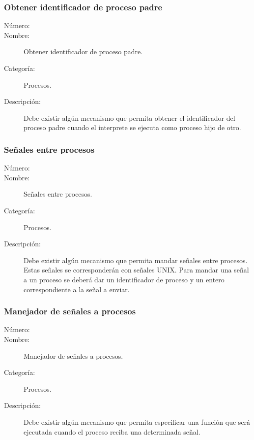\subsubsection{Obtener identificador de proceso padre}
	\begin{description}
		\item [Número:] \cn
		\item [Nombre:] Obtener identificador de proceso padre.
		\item [Categoría:] Procesos.
		\item [Descripción:] Debe existir algún mecanismo que permita obtener el identificador del proceso padre cuando 
		el interprete se ejecuta como proceso hijo de otro.
	\end{description}

\subsubsection{Señales entre procesos}
	\begin{description}
		\item [Número:] \cn
		\item [Nombre:] Señales entre procesos.
		\item [Categoría:] Procesos.
		\item [Descripción:] Debe existir algún mecanismo que permita mandar señales entre procesos. Estas señales se corresponderán con
      señales UNIX. Para mandar una señal a un proceso se deberá dar un identificador de proceso y un entero correspondiente a la
      señal a enviar.
	\end{description}

\subsubsection{Manejador de señales a procesos}
	\begin{description}
		\item [Número:] \cn
		\item [Nombre:] Manejador de señales a procesos.
		\item [Categoría:] Procesos.
		\item [Descripción:] Debe existir algún mecanismo que permita especificar una función que será ejecutada cuando el proceso reciba una 
      determinada señal.
	\end{description}

